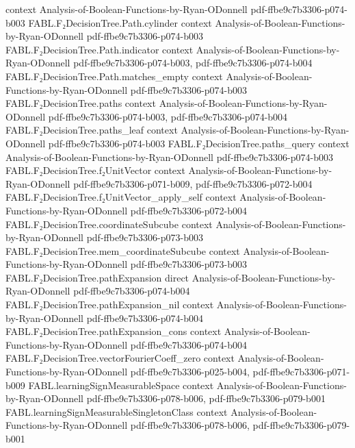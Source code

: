 \begin{theorem}
  {context}
  {Analysis-of-Boolean-Functions-by-Ryan-ODonnell}
  {pdf-ffbe9c7b3306-p074-b003}
\proofstep
  {FABL.F₂DecisionTree.Path.cylinder}
  {context}
  {Analysis-of-Boolean-Functions-by-Ryan-ODonnell}
  {pdf-ffbe9c7b3306-p074-b003}
\proofstep
  {FABL.F₂DecisionTree.Path.indicator}
  {context}
  {Analysis-of-Boolean-Functions-by-Ryan-ODonnell}
  {pdf-ffbe9c7b3306-p074-b003,
    pdf-ffbe9c7b3306-p074-b004}
\proofstep
  {FABL.F₂DecisionTree.Path.matches_empty}
  {context}
  {Analysis-of-Boolean-Functions-by-Ryan-ODonnell}
  {pdf-ffbe9c7b3306-p074-b003}
\proofstep
  {FABL.F₂DecisionTree.paths}
  {context}
  {Analysis-of-Boolean-Functions-by-Ryan-ODonnell}
  {pdf-ffbe9c7b3306-p074-b003,
    pdf-ffbe9c7b3306-p074-b004}
\proofstep
  {FABL.F₂DecisionTree.paths_leaf}
  {context}
  {Analysis-of-Boolean-Functions-by-Ryan-ODonnell}
  {pdf-ffbe9c7b3306-p074-b003}
\proofstep
  {FABL.F₂DecisionTree.paths_query}
  {context}
  {Analysis-of-Boolean-Functions-by-Ryan-ODonnell}
  {pdf-ffbe9c7b3306-p074-b003}
\proofstep
  {FABL.F₂DecisionTree.f₂UnitVector}
  {context}
  {Analysis-of-Boolean-Functions-by-Ryan-ODonnell}
  {pdf-ffbe9c7b3306-p071-b009,
    pdf-ffbe9c7b3306-p072-b004}
\proofstep
  {FABL.F₂DecisionTree.f₂UnitVector_apply_self}
  {context}
  {Analysis-of-Boolean-Functions-by-Ryan-ODonnell}
  {pdf-ffbe9c7b3306-p072-b004}
\proofstep
  {FABL.F₂DecisionTree.coordinateSubcube}
  {context}
  {Analysis-of-Boolean-Functions-by-Ryan-ODonnell}
  {pdf-ffbe9c7b3306-p073-b003}
\proofstep
  {FABL.F₂DecisionTree.mem_coordinateSubcube}
  {context}
  {Analysis-of-Boolean-Functions-by-Ryan-ODonnell}
  {pdf-ffbe9c7b3306-p073-b003}
\proofstep
  {FABL.F₂DecisionTree.pathExpansion}
  {direct}
  {Analysis-of-Boolean-Functions-by-Ryan-ODonnell}
  {pdf-ffbe9c7b3306-p074-b004}
\proofstep
  {FABL.F₂DecisionTree.pathExpansion_nil}
  {context}
  {Analysis-of-Boolean-Functions-by-Ryan-ODonnell}
  {pdf-ffbe9c7b3306-p074-b004}
\proofstep
  {FABL.F₂DecisionTree.pathExpansion_cons}
  {context}
  {Analysis-of-Boolean-Functions-by-Ryan-ODonnell}
  {pdf-ffbe9c7b3306-p074-b004}
\proofstep
  {FABL.F₂DecisionTree.vectorFourierCoeff_zero}
  {context}
  {Analysis-of-Boolean-Functions-by-Ryan-ODonnell}
  {pdf-ffbe9c7b3306-p025-b004,
    pdf-ffbe9c7b3306-p071-b009}
\proofstep
  {FABL.learningSignMeasurableSpace}
  {context}
  {Analysis-of-Boolean-Functions-by-Ryan-ODonnell}
  {pdf-ffbe9c7b3306-p078-b006,
    pdf-ffbe9c7b3306-p079-b001}
\proofstep
  {FABL.learningSignMeasurableSingletonClass}
  {context}
  {Analysis-of-Boolean-Functions-by-Ryan-ODonnell}
  {pdf-ffbe9c7b3306-p078-b006,
    pdf-ffbe9c7b3306-p079-b001}

\end{theorem}
